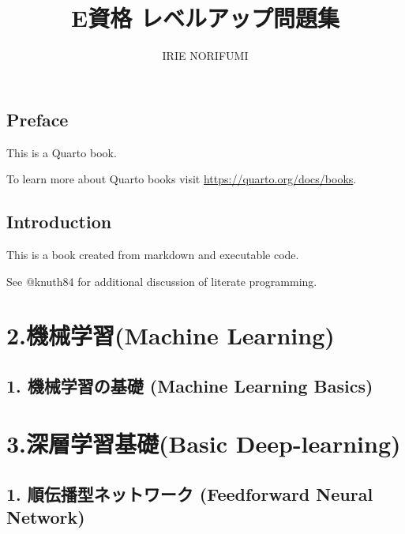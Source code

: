 \documentclass[
  letterpaper,
  DIV=11,
  numbers=noendperiod]{scrreprt}
\title{E資格 レベルアップ問題集}
\author{IRIE NORIFUMI}
\date{}
\renewcommand*\contentsname{Table of contents}
\newcommand\contentsname{Table of contents}
\begin{document}
\maketitle

\renewcommand*\contentsname{Table of contents}
{
\hypersetup{linkcolor=}
\setcounter{tocdepth}{2}
\tableofcontents
}


\chapter*{Preface}\label{preface}


This is a Quarto book.

To learn more about Quarto books visit
\url{https://quarto.org/docs/books}.


\chapter{Introduction}\label{introduction}

This is a book created from markdown and executable code.

See @knuth84 for additional discussion of literate programming.

\part{2.機械学習(Machine Learning)}

\chapter{1. 機械学習の基礎 (Machine Learning
Basics)}\label{ux6a5fux68b0ux5b66ux7fd2ux306eux57faux790e-machine-learning-basics}

\part{3.深層学習基礎(Basic Deep-learning)}

\chapter{1. 順伝播型ネットワーク (Feedforward Neural
Network)}\label{ux9806ux4f1dux64adux578bux30cdux30c3ux30c8ux30efux30fcux30af-feedforward-neural-network}
\end{document}
